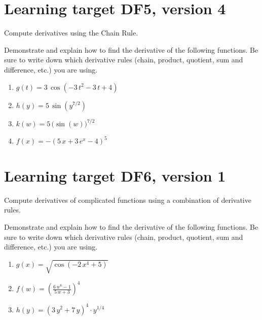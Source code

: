 \pagebreak

\section{Learning target DF5, version 4}

Compute derivatives using the Chain Rule.

\hrulefill

Demonstrate and explain how to find the derivative of the following functions. Be sure to write down which derivative rules (chain, product, quotient, sum and difference, etc.) you are using.

\begin{enumerate}
    \item \(g(t)= 3 \, \cos\left(-3 \, t^{2} - 3 \, t + 4\right)\)
    \vfill
    \item \(h(y)= 5 \, \sin\left(y^{7/2}\right)\)
    \vfill
    \item \(k(w)= 5 \, \Big(\sin\left(w\right)\Big)^{7/2}\)
    \vfill
    \item \(f(x)= -{\left(5 \, x + 3 \, e^{x} - 4\right)}^{5}\)
    \vfill
\end{enumerate}

\pagebreak

\section{Learning target DF6, version 1}

Compute derivatives of complicated functions using a combination of derivative rules.

\hrulefill

Demonstrate and explain how to find the derivative of the following functions. Be sure to write down which derivative rules (chain, product, quotient, sum and difference, etc.) you are using.

\begin{enumerate}
    \item \(g(x) = \sqrt{\cos\left(-2 \, x^{4} + 5\right)}\)
    \vfill
    \item \(f(w) = \left( \frac{6 \, w^{6} - 1}{5 \, w + 3} \right)^{ 4 }\)
    \vfill
    \item \(h(y) = {\left(3 \, y^{2} + 7 \, y\right)}^{4}\cdot y^{1/4}\)
    \vfill
\end{enumerate}



